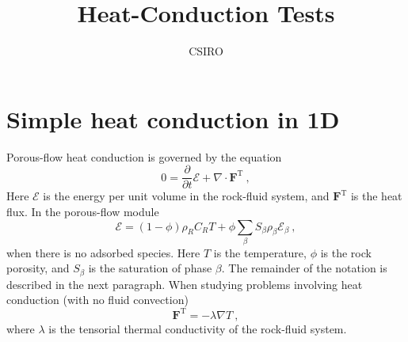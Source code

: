 \documentclass[]{scrreprt}
\def\phase{\beta}
\def\flux{\mathbf{F}}
\def\energydens{\mathcal{E}}
\begin{document}
\title{Heat-Conduction Tests}
\author{CSIRO}
\maketitle

\tableofcontents

\chapter{Simple heat conduction in 1D}

Porous-flow heat conduction is governed by the equation
\begin{equation}
0 = \frac{\partial}{\partial t}\energydens + \nabla\cdot \flux^{\mathrm{T}} \ ,
\label{eqn.heat.cond}
\end{equation}
Here $\energydens$ is the energy per unit volume in the rock-fluid
system, and $\flux^{\mathrm{T}}$ is the heat flux.  In the
porous-flow module
\begin{equation}
\energydens = (1 - \phi)\rho_{R}C_{R} T + \phi
\sum_{\phase}S_{\phase}\rho_{\phase}\energydens_{\phase} \ ,
\end{equation}
when there is no adsorbed species.  Here $T$ is the temperature,
$\phi$ is the rock porosity, and $S_{\phase}$ is the saturation of
phase $\phase$.  The remainder of the notation is described in the
next paragraph.  When studying problems involving heat conduction
(with no fluid convection)
\begin{equation}
\flux^{\mathrm{T}} = -\lambda\nabla T \ ,
\end{equation}
where $\lambda$ is the tensorial thermal conductivity of the
rock-fluid system.
\end{document}
